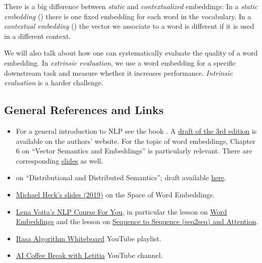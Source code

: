 \documentclass[11pt, a4paper]{amsart}
\begin{document}
There is a big difference between \emph{static} and \emph{contextualized} embeddings:
In a \emph{static embedding} () there is one fixed embedding for each word in the vocabulary.
In a \emph{contextual embedding} () the vector we associate to a word is different if it is used in a different context.

We will also talk about how one can systematically evaluate the quality of a word embedding.
In \emph{extrinsic evaluation}, we use a word embedding for a specific downstream task and measure whether it increases performance.
\emph{Intrinsic evaluation} is a harder challenge.

\subsection{General References and Links}
\label{sec:general_references}

\begin{itemize}
    \item For a general introduction to NLP see the book \cite{jurafsky2009speech}.
    A \href{https://web.stanford.edu/~jurafsky/slp3/}{draft of the 3rd edition} is available on the authors' website.
    For the topic of word embeddings, Chapter 6 on ``Vector Semantics and Embeddings'' is particularly relevant.
    There are corresponding \href{https://web.stanford.edu/~jurafsky/slp3/slides/6_Vector_Apr18_2021.pdf}{slides} as well.

    \item \cite[Chp.~14]{eisenstein2019introduction} on ``Distributional and Distributed Semantics'';
    draft available \href{https://github.com/jacobeisenstein/gt-nlp-class/blob/master/notes/eisenstein-nlp-notes.pdf}{here}.

    \item \href{https://www.cs.hhu.de/fileadmin/redaktion/Fakultaeten/Mathematisch-Naturwissenschaftliche_Fakultaet/Informatik/Dialog_Systems_and_Machine_Learning/20190705_word_embeddings.pdf}{Michael Heck's slides (2019)} on the Space of Word Embeddings.
    
    \item \href{https://lena-voita.github.io/nlp_course}{Lena Voita's NLP Course For You}, in particular the lesson on \href{https://lena-voita.github.io/nlp_course/word_embeddings}{Word Embeddings} and the lesson on \href{https://lena-voita.github.io/nlp_course/seq2seq_and_attention.html}{Sequence to Sequence (seq2seq) and Attention}.
    
    \item \href{https://youtube.com/playlist?list=PL75e0qA87dlG-za8eLI6t0_Pbxafk-cxb}{Rasa Algorithm Whiteboard} YouTube playlist.
    
    \item \href{https://www.youtube.com/c/aicoffeebreak}{AI Coffee Break with Letitia} YouTube channel.
\end{itemize}
\end{document}
